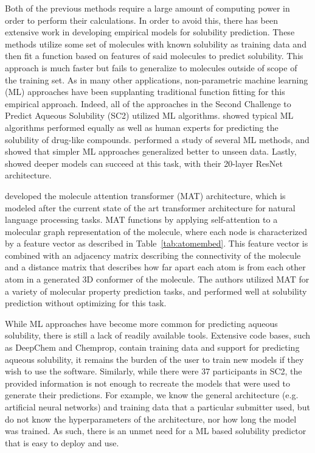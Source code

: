 \documentclass[journal=jcim,manuscript=applicationnotes]{achemso}
\begin{document}
Both of the previous methods require a large amount of computing power in order to perform their calculations.
In order to avoid this, there has been extensive work in developing empirical models for solubility prediction\cite{solrev1,solrev2}.
These methods utilize some set of molecules with known solubility as training data and then fit a function based on features of said molecules to predict solubility.
This approach is much faster but fails to generalize to molecules outside of scope of the training set.
As in many other applications, non-parametric machine learning (ML) approaches have been supplanting traditional function fitting for this empirical approach.
Indeed, all of the approaches in the Second Challenge to Predict Aqueous Solubility (SC2) utilized ML algorithms.\cite{llinas}
\citet{boobier} showed typical ML algorithms performed equally as well as human experts for predicting the solubility of drug-like compounds.
\citet{lovric} performed a study of several ML methods, and showed that simpler ML approaches generalized better to unseen data.
Lastly, \citet{cui} showed deeper models can succeed at this task, with their 20-layer ResNet architecture.

\citet{MAT} developed the molecule attention transformer (MAT) architecture, which is modeled after the current state of the art transformer architecture for natural language processing tasks.
MAT functions by applying self-attention to a molecular graph representation of the molecule, where each node is characterized by a feature vector as described in Table~\ref{tab:atomembed}.
This feature vector is combined with an adjacency matrix describing the connectivity of the molecule and a distance matrix that describes how far apart each atom is from each other atom in a generated 3D conformer of the molecule.
The authors utilized MAT for a variety of molecular property prediction tasks, and performed well at solubility prediction without optimizing for this task.

While ML approaches have become more common for predicting aqueous solubility, there is still a lack of readily available tools.
Extensive code bases, such as DeepChem\cite{deepchem} and Chemprop\cite{chemprop}, contain training data and support for predicting aqueous solubility, it remains the burden of the user to train new models if they wish to use the software.
Similarly, while there were 37 participants in SC2, the provided information is not enough to recreate the models that were used to generate their predictions.
For example, we know the general architecture (e.g. artificial neural networks) and training data that a particular submitter used, but do not know the hyperparameters of the architecture, nor how long the model was trained.
As such, there is an unmet need for a ML based solubility predictor that is easy to deploy and use.
\end{document}
